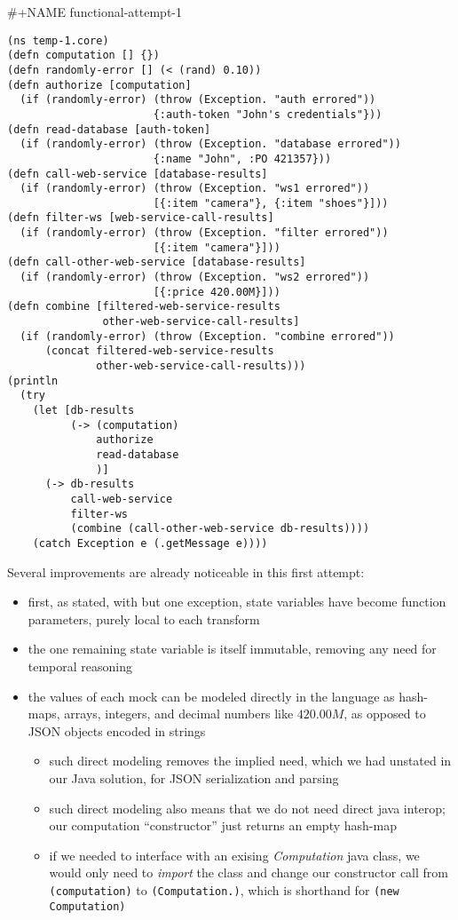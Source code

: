 \documentclass[11pt]{article}
\begin{document}
\#+NAME functional-attempt-1
\begin{verbatim}
(ns temp-1.core)
(defn computation [] {})
(defn randomly-error [] (< (rand) 0.10))
(defn authorize [computation]
  (if (randomly-error) (throw (Exception. "auth errored"))
                       {:auth-token "John's credentials"}))
(defn read-database [auth-token]
  (if (randomly-error) (throw (Exception. "database errored"))
                       {:name "John", :PO 421357}))
(defn call-web-service [database-results]
  (if (randomly-error) (throw (Exception. "ws1 errored"))
                       [{:item "camera"}, {:item "shoes"}]))
(defn filter-ws [web-service-call-results]
  (if (randomly-error) (throw (Exception. "filter errored"))
                       [{:item "camera"}]))
(defn call-other-web-service [database-results]
  (if (randomly-error) (throw (Exception. "ws2 errored"))
                       [{:price 420.00M}]))
(defn combine [filtered-web-service-results
               other-web-service-call-results]
  (if (randomly-error) (throw (Exception. "combine errored"))
      (concat filtered-web-service-results
              other-web-service-call-results)))
(println
  (try
    (let [db-results
          (-> (computation)
              authorize
              read-database
              )]
      (-> db-results
          call-web-service
          filter-ws
          (combine (call-other-web-service db-results))))
    (catch Exception e (.getMessage e))))
\end{verbatim}

Several improvements are already noticeable in this first attempt: 
\begin{itemize}
\item first, as stated, with but one exception, state variables have
become function parameters, purely local to each transform
\item the one remaining state variable is itself immutable, removing
any need for temporal reasoning
\item the values of each mock can be modeled directly in the language
as hash-maps, arrays, integers, and decimal numbers like
$420.00M$, as opposed to JSON objects encoded in strings
\begin{itemize}
\item such direct modeling removes the implied need, which we had
unstated in our Java solution, for JSON serialization and
parsing
\item such direct modeling also means that we do not need direct java
interop; our computation ``constructor'' just returns an empty
hash-map
\item if we needed to interface with an exising \emph{Computation} java
class, we would only need to \emph{import} the class and change our
constructor call from \verb|(computation)| to
\verb|(Computation.)|, which is shorthand for 
\verb|(new Computation)|
\end{itemize}
\end{itemize}
\end{document}
